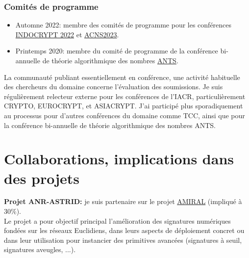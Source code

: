\documentclass[11pt]{article}
\begin{document}
\subsubsection*{Comités de programme}

\begin{itemize}[label = $\bullet$]
\item Automne 2022: membre des comités de programme pour les conférences \href{https://www.tcgcrest.org/indocrypt-2022/}{INDOCRYPT 2022} et \href{https://sulab-sever.u-aizu.ac.jp/ACNS2023/}{ACNS2023}.
\item Printemps 2020: membre du comité de programme de la conférence bi-annuelle de théorie algorithmique des nombres \href{https://www.math.auckland.ac.nz/~sgal018/ANTS/}{ANTS}.
\end{itemize}
La communauté publiant essentiellement en conférence, une activité habituelle des chercheurs du domaine concerne l'évaluation des soumissions.
Je suis régulièrement relecteur externe pour les conférences de l'IACR, particulièrement CRYPTO, EUROCRYPT, et ASIACRYPT.
J'ai participé plus sporadiquement au processus pour d'autres conférences du domaine comme TCC, ainsi que pour la conférence bi-annuelle de théorie algorithmique des nombres ANTS.


\section{Collaborations, implications dans des projets}


\noindent\textbf{Projet ANR-ASTRID:} je suis partenaire sur le projet \href{https://project.inria.fr/amiral/}{AMIRAL} (impliqué à 30\%).\\
Le projet a pour objectif principal l'amélioration des signatures numériques fondées sur les réseaux Euclidiens, dans leurs aspects de déploiement concret ou dans leur utilisation pour instancier des primitives avancées (signatures à seuil, signatures aveugles, ...).\\
\end{document}
